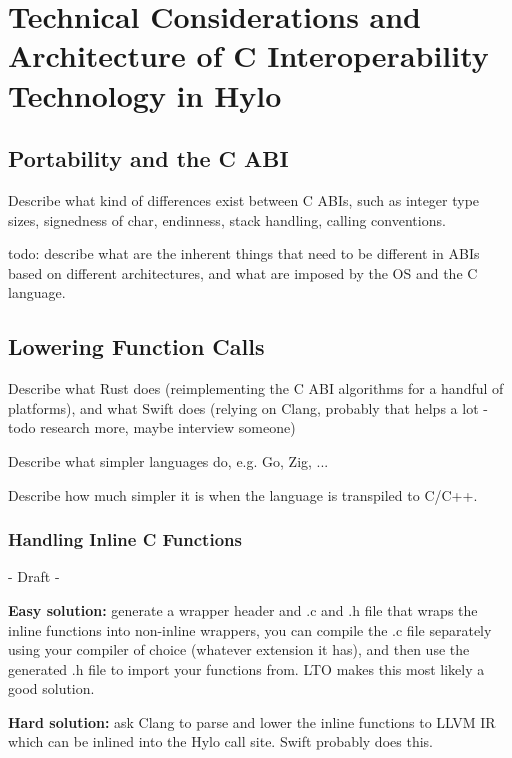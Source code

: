 \section{Technical Considerations and Architecture of C Interoperability Technology in Hylo}

\subsection{Portability and the C ABI}
Describe what kind of differences exist between C ABIs, such as integer type sizes, signedness of char, endinness, stack handling, calling conventions. 

todo: describe what are the inherent things that need to be different in ABIs based on different architectures, and what are imposed by the OS and the C language.

\bigbreak \bigbreak \bigbreak
\bigbreak \bigbreak \bigbreak
\bigbreak \bigbreak \bigbreak
\bigbreak \bigbreak \bigbreak

\subsection{Lowering Function Calls}
Describe what Rust does (reimplementing the C ABI algorithms for a handful of platforms), and what Swift does (relying on Clang, probably that helps a lot - todo research more, maybe interview someone)

Describe what simpler languages do, e.g. Go, Zig, ... 

Describe how much simpler it is when the language is transpiled to C/C++.

\subsubsection{Handling Inline C Functions}
\label{sec:handling_inline_c_functions}
- Draft - 

\textbf{Easy solution:} generate a wrapper header and .c and .h file that wraps the inline functions into non-inline wrappers, you can compile the .c file separately using your compiler of choice (whatever extension it has), and then use the generated .h file to import your functions from. LTO makes this most likely a good solution.

\textbf{Hard solution:} ask Clang to parse and lower the inline functions to LLVM IR which can be inlined into the Hylo call site. Swift probably does this.





